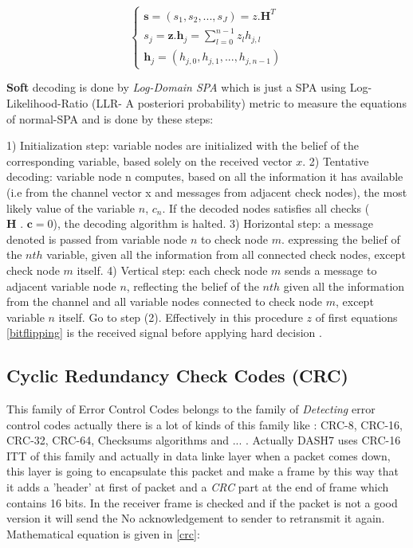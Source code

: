 \begin{equation} \label{bitflipping}
\left\{\begin{matrix}
\textbf{s} = (s_{1},s_{2}, ..., s_{J}) = z . \textbf{H}^{T} \\
s_{j} = \textbf{z} . \textbf{h}_{j} = \sum_{l=0}^{n-1} z_{l}h_{j,l}\\
\textbf{h}_{j} = (h_{j,0},h_{j,1}, ...,h_{j,n-1})
\end{matrix}\right.
\end{equation}
%

\textbf{Soft} decoding is done by \textit{Log-Domain SPA} which is just a SPA using Log-Likelihood-Ratio (LLR- A posteriori probability) metric to measure the equations of normal-SPA and is done by these steps:

1) Initialization step: variable nodes are initialized with the belief of the corresponding variable, based solely on the received vector $x$. 2) Tentative decoding: variable node n computes, based on all the information it has available (i.e from the channel vector x and messages from adjacent check nodes), the most likely value of the variable $n$, $c_{n}$. If the decoded nodes satisfies all checks ($\textbf{H . c} = 0$), the  decoding algorithm is halted. 3) Horizontal step: a message denoted is passed from variable node $n$ to check node $m$. expressing the belief of the $nth$ variable, given all the information from all connected check nodes, except check node $m$ itself. 4) Vertical step: each check node $m$ sends a message to adjacent variable node $n$, reflecting the belief of the $nth$ given all the information from the channel and all variable nodes connected to check node $m$, except variable $n$ itself. Go to step (2). Effectively in this procedure $z$ of first equations \ref{bitflipping}  is the received signal before applying hard decision \citep{errorcontrolcoding} \cite{LDPC}.

\subsection{Cyclic Redundancy Check Codes (CRC)}
This family of Error Control Codes belongs to the family of \textit{Detecting} error control codes actually there is a lot of kinds of this family like : CRC-8, CRC-16, CRC-32, CRC-64, Checksums algorithms and ... . Actually DASH7 uses CRC-16 ITT of this family and actually in data linke layer when a packet comes down, this layer is going to encapsulate this packet and make a frame by this way that it adds a 'header' at first of packet and a \textit{CRC} part at the end of frame which contains 16 bits.
 In the receiver frame is checked and if the packet is not a good version it will send the No acknowledgement to sender to retransmit it again. Mathematical equation is given in \ref{crc}:
 
